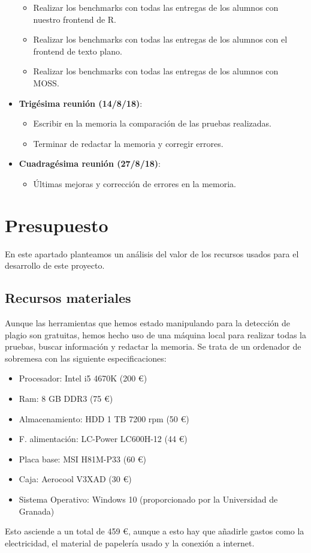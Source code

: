 \begin{itemize}
	\begin{itemize}
	\item Realizar los benchmarks con todas las entregas de los alumnos con nuestro frontend de R. 
	\item Realizar los benchmarks con todas las entregas de los alumnos con el frontend de texto plano.
	\item Realizar los benchmarks con todas las entregas de los alumnos con MOSS.
	\end{itemize}
	\item \textbf{Trigésima reunión (14/8/18)}:
	\begin{itemize}
	\item Escribir en la memoria la comparación de las pruebas realizadas.
	\item Terminar de redactar la memoria y corregir errores.
	\end{itemize}
	\item \textbf{Cuadragésima reunión (27/8/18)}:
	\begin{itemize}
	\item Últimas mejoras y corrección de errores en la memoria.
	\end{itemize}
\end{itemize}

\section{Presupuesto}

En este apartado planteamos un análisis del valor de los recursos usados para el desarrollo de este proyecto.
\subsection{Recursos materiales}
Aunque las herramientas que hemos estado manipulando para la detección de plagio son gratuitas, hemos hecho uso de una máquina local para realizar todas la pruebas, buscar información y redactar la memoria. Se trata de un ordenador de sobremesa con las siguiente especificaciones:
\begin{itemize}
\item Procesador: Intel i5 4670K (200 \euro)
\item Ram: 8 GB DDR3 (75 \euro)
\item Almacenamiento: HDD 1 TB 7200 rpm (50 \euro)
\item F. alimentación: LC-Power LC600H-12 (44 \euro)
\item Placa base: MSI H81M-P33 (60 \euro)
\item Caja: Aerocool V3XAD (30 \euro) 
\item Sistema Operativo: Windows 10 (proporcionado por la Universidad de Granada)
\end{itemize}
Esto asciende a un total de 459 \euro , aunque a esto hay que añadirle gastos como la electricidad, el material de papelería usado y la conexión a internet. 


